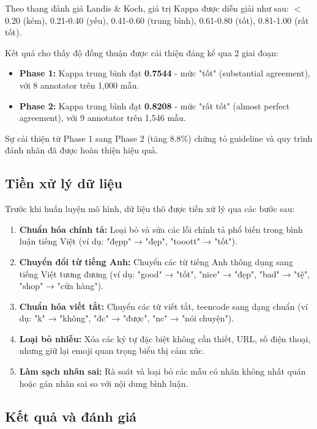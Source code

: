 Theo thang đánh giá Landis \& Koch, giá trị Kappa được diễn giải như sau: $<$ 0.20 (kém), 0.21-0.40 (yếu), 0.41-0.60 (trung bình), 0.61-0.80 (tốt), 0.81-1.00 (rất tốt). 

Kết quả cho thấy độ đồng thuận được cải thiện đáng kể qua 2 giai đoạn:
\begin{itemize}
    \item \textbf{Phase 1:} Kappa trung bình đạt \textbf{0.7544} - mức "tốt" (substantial agreement), với 8 annotator trên 1,000 mẫu.
    \item \textbf{Phase 2:} Kappa trung bình đạt \textbf{0.8208} - mức "rất tốt" (almost perfect agreement), với 9 annotator trên 1,546 mẫu.
\end{itemize}

Sự cải thiện từ Phase 1 sang Phase 2 (tăng 8.8\%) chứng tỏ guideline và quy trình đánh nhãn đã được hoàn thiện hiệu quả.

\subsection{Tiền xử lý dữ liệu}
Trước khi huấn luyện mô hình, dữ liệu thô được tiền xử lý qua các bước sau:

\begin{enumerate}
    \item \textbf{Chuẩn hóa chính tả:} Loại bỏ và sửa các lỗi chính tả phổ biến trong bình luận tiếng Việt (ví dụ: "đẹpp" → "đẹp", "tooott" → "tốt").
    \item \textbf{Chuyển đổi từ tiếng Anh:} Chuyển các từ tiếng Anh thông dụng sang tiếng Việt tương đương (ví dụ: "good" → "tốt", "nice" → "đẹp", "bad" → "tệ", "shop" → "cửa hàng").
    \item \textbf{Chuẩn hóa viết tắt:} Chuyển các từ viết tắt, teencode sang dạng chuẩn (ví dụ: "k" → "không", "đc" → "được", "nc" → "nói chuyện").
    \item \textbf{Loại bỏ nhiễu:} Xóa các ký tự đặc biệt không cần thiết, URL, số điện thoại, nhưng giữ lại emoji quan trọng biểu thị cảm xúc.
    \item \textbf{Làm sạch nhãn sai:} Rà soát và loại bỏ các mẫu có nhãn không nhất quán hoặc gán nhãn sai so với nội dung bình luận.
\end{enumerate}

\subsection{Kết quả và đánh giá}

